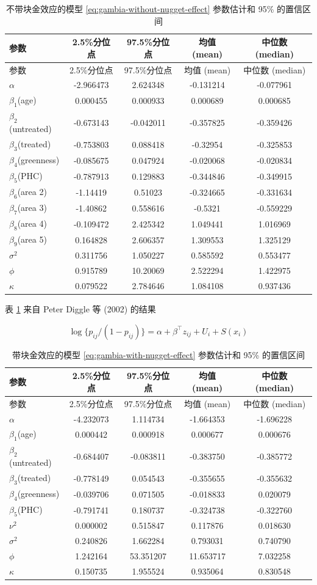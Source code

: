 \documentclass[12pt,a4paper,UTF8,twoside]{book}
\theoremstyle{definition}
\theoremstyle{definition}
\theoremstyle{definition}
\theoremstyle{remark}
\begin{document}
\begin{longtable}[]{@{}lcccc@{}}
\caption{\label{tab:gambia-without-nugget-effect} 不带块金效应的模型
\eqref{eq:gambia-without-nugget-effect} 参数估计和 95\%
的置信区间}\tabularnewline
\toprule
参数 & 2.5\%分位点 & 97.5\%分位点 & 均值 (mean) & 中位数
(median)\tabularnewline
\midrule
\endfirsthead
\toprule
参数 & 2.5\%分位点 & 97.5\%分位点 & 均值 (mean) & 中位数
(median)\tabularnewline
\midrule
\endhead
\(\alpha\) & -2.966473 & 2.624348 & -0.131214 & -0.077961\tabularnewline
\(\beta_1\)(age) & 0.000455 & 0.000933 & 0.000689 &
0.000685\tabularnewline
\(\beta_2\)(untreated) & -0.673143 & -0.042011 & -0.357825 &
-0.359426\tabularnewline
\(\beta_3\)(treated) & -0.753803 & 0.088418 & -0.32954 &
-0.325853\tabularnewline
\(\beta_4\)(greenness) & -0.085675 & 0.047924 & -0.020068 &
-0.020834\tabularnewline
\(\beta_5\)(PHC) & -0.787913 & 0.129883 & -0.344846 &
-0.349915\tabularnewline
\(\beta_6\)(area 2) & -1.14419 & 0.51023 & -0.324665 &
-0.331634\tabularnewline
\(\beta_7\)(area 3) & -1.40862 & 0.558616 & -0.5321 &
-0.559229\tabularnewline
\(\beta_8\)(area 4) & -0.109472 & 2.425342 & 1.049441 &
1.016969\tabularnewline
\(\beta_9\)(area 5) & 0.164828 & 2.606357 & 1.309553 &
1.325129\tabularnewline
\(\sigma^2\) & 0.311756 & 1.050227 & 0.585592 & 0.553477\tabularnewline
\(\phi\) & 0.915789 & 10.20069 & 2.522294 & 1.422975\tabularnewline
\(\kappa\) & 0.079522 & 2.784646 & 1.084108 & 0.937436\tabularnewline
\bottomrule
\end{longtable}

表 \ref{tab:gambia-without-nugget-effect} 来自 Peter Diggle 等 (2002)
\citep{Diggle2002Childhood} 的结果

\begin{equation}
\log\{p_{ij}/(1-p_{ij})\} = \alpha + \beta^{\top}z_{ij} + U_{i} + S(x_i) \label{eq:gambia-with-nugget-effect}
\end{equation}

\begin{longtable}[]{@{}lcccc@{}}
\caption{\label{tab:gambia-with-nugget-effect} 带块金效应的模型
\eqref{eq:gambia-with-nugget-effect} 参数估计和 95\%
的置信区间}\tabularnewline
\toprule
参数 & 2.5\%分位点 & 97.5\%分位点 & 均值 (mean) & 中位数
(median)\tabularnewline
\midrule
\endfirsthead
\toprule
参数 & 2.5\%分位点 & 97.5\%分位点 & 均值 (mean) & 中位数
(median)\tabularnewline
\midrule
\endhead
\(\alpha\) & -4.232073 & 1.114734 & -1.664353 & -1.696228\tabularnewline
\(\beta_1\)(age) & 0.000442 & 0.000918 & 0.000677 &
0.000676\tabularnewline
\(\beta_2\)(untreated) & -0.684407 & -0.083811 & -0.383750 &
-0.385772\tabularnewline
\(\beta_3\)(treated) & -0.778149 & 0.054543 & -0.355655 &
-0.355632\tabularnewline
\(\beta_4\)(greenness) & -0.039706 & 0.071505 & -0.018833 &
0.020079\tabularnewline
\(\beta_5\)(PHC) & -0.791741 & 0.180737 & -0.324738 &
-0.322760\tabularnewline
\(\nu^2\) & 0.000002 & 0.515847 & 0.117876 & 0.018630\tabularnewline
\(\sigma^2\) & 0.240826 & 1.662284 & 0.793031 & 0.740790\tabularnewline
\(\phi\) & 1.242164 & 53.351207 & 11.653717 & 7.032258\tabularnewline
\(\kappa\) & 0.150735 & 1.955524 & 0.935064 & 0.830548\tabularnewline
\bottomrule
\end{longtable}
\end{document}
